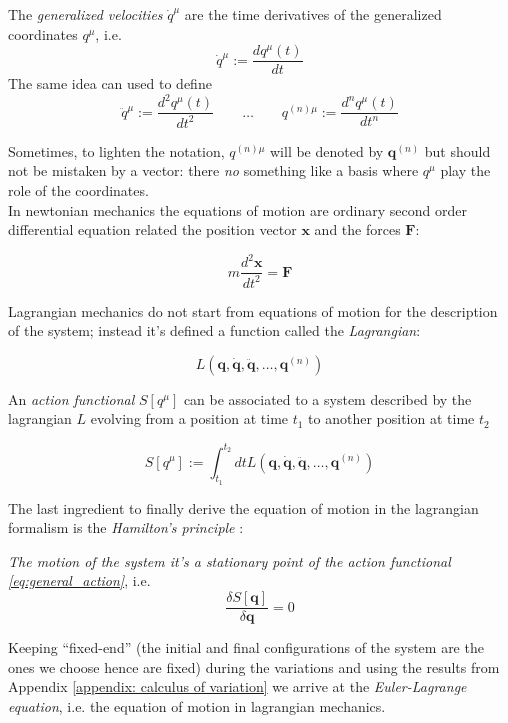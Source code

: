 \begin{definition}
  The \emph{generalized velocities} $\dot{q}^{\mu}$ are the time derivatives of the
  generalized coordinates $q^{\mu}$, i.e.
  \begin{equation*}
    \dot{q}^{\mu} := \frac{dq^{\mu}(t)}{dt}
  \end{equation*}
  The same idea can used to define
  \begin{equation*}
    \ddot{q}^{\mu} := \frac{d^2q^{\mu}(t)}{dt^2} \qquad \ldots \qquad
        q^{(n)\mu} := \frac{d^nq^{\mu}(t)}{dt^n}
  \end{equation*}
\end{definition}

Sometimes, to lighten the notation, $q^{(n)\mu}$ will be denoted by
$\bm{q}^{(n)}$ but should not be mistaken by a vector: there \emph{no} something
like a basis where $q^{\mu}$ play the role of the coordinates. \\

In newtonian mechanics the equations of motion are ordinary second order
differential equation related the position vector $\bm{x}$ and the forces
$\bm{F}$:

\begin{equation*}
  m \frac{d^2\bm{x}}{dt^2} = \bm{F}
\end{equation*}

Lagrangian mechanics do not start from equations of motion for the description
of the system; instead it's defined a function called the \emph{Lagrangian}:

\begin{equation} \label{eq:general_lagrangian}
  L(\bm{q}, \dot{\bm{q}}, \ddot{\bm{q}}, \ldots, \bm{q}^{(n)})
\end{equation}

An \emph{action functional} $S[q^{\mu}]$ can be associated to a system described
by the lagrangian $L$ evolving from a position at time $t_1$ to another position
at time $t_2$

\begin{equation} \label{eq:general_action}
  S[q^{\mu}] := \int_{t_1}^{t_2} dt
  L(\bm{q}, \dot{\bm{q}}, \ddot{\bm{q}}, \ldots, \bm{q}^{(n)})
\end{equation}

The last ingredient to finally derive the equation of motion in the lagrangian
formalism is the \emph{Hamilton's principle} \cite{Goldstein11_Ham_principle}:
\begin{displayquote}
  \emph{The motion of the system it's a stationary point of the action
  functional \eqref{eq:general_action}}, i.e.
  \begin{equation*}
    \frac{\delta S[\bm{q}]}{\delta \bm{q}} = 0
  \end{equation*}
\end{displayquote}
Keeping ``fixed-end'' (the initial and final configurations of the system are
the ones we choose hence are fixed) during the variations and using the results
from Appendix \ref{appendix: calculus of variation} we arrive at the
\emph{Euler-Lagrange equation}, i.e. the equation of motion in lagrangian
mechanics.

